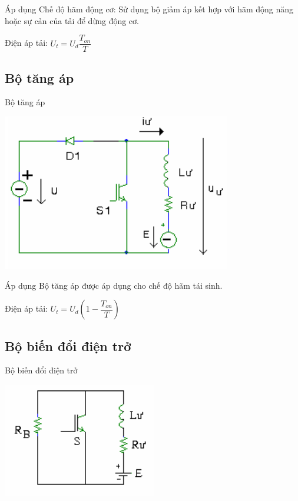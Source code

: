 \documentclass[24pt]{beamer}
\newcommand{\pfm}[1]{\left({#1}\right)}
\begin{document}
\begin{frame}{Áp dụng}
\justifying
\alert{Chế độ hãm động cơ:} Sử dụng \alert{bộ giảm áp} kết hợp với \alert{hãm động năng} hoặc \alert{sự cản của tải} để dừng động cơ.

Điện áp tải: \alert{$U_t = U_d\dfrac{T_{on}}{T}$}
\end{frame}

\subsection*{Bộ tăng áp}
\begin{frame}{Bộ tăng áp}
	\vspace{-.4cm}
	\begin{center}
		\includegraphics[scale=.7]{images-chude5/bo-tang-ap.png} 
	\end{center}
\end{frame}

\begin{frame}{Áp dụng}
\justifying
\alert{Bộ tăng áp} được áp dụng cho chế độ \alert{hãm tái sinh}.

Điện áp tải: \alert{$U_t = U_d\pfm{1 - \dfrac{T_{on}}{T}}$}
\end{frame}

\subsection*{Bộ biến đổi điện trở}
\begin{frame}{Bộ biến đổi điện trở}
	\vspace{-.5cm}
	\begin{center}
		\includegraphics[scale=.9]{images-chude5/bo-bien-doi-dien-tro.png} 
	\end{center}
\end{frame}
\end{document}
